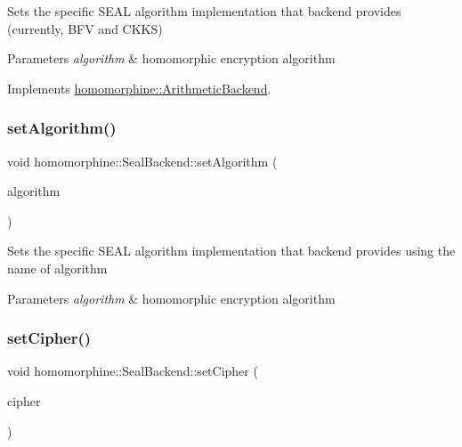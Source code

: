 Sets the specific S\+E\+AL algorithm implementation that backend provides (currently, B\+FV and C\+K\+KS)


\begin{DoxyParams}{Parameters}
{\em algorithm} & homomorphic encryption algorithm \\
\hline
\end{DoxyParams}


Implements \mbox{\hyperlink{classhomomorphine_1_1_arithmetic_backend_ac53135f4f66a2f7a33d3c6e6d465b86f}{homomorphine\+::\+Arithmetic\+Backend}}.

\mbox{\label{classhomomorphine_1_1_seal_backend_aaf2100eb13b4434bc0136ff00578bb8d}} 
\subsubsection{\texorpdfstring{setAlgorithm()}{setAlgorithm()}\hspace{0.1cm}{\footnotesize\ttfamily [2/2]}}
{\footnotesize\ttfamily void homomorphine\+::\+Seal\+Backend\+::set\+Algorithm (\begin{DoxyParamCaption}\item[{Seal\+Algorithm}]{algorithm }\end{DoxyParamCaption})}

Sets the specific S\+E\+AL algorithm implementation that backend provides using the name of algorithm


\begin{DoxyParams}{Parameters}
{\em algorithm} & homomorphic encryption algorithm \\
\hline
\end{DoxyParams}
\mbox{\label{classhomomorphine_1_1_seal_backend_a866b58e41809d68d4c6ed8c3afb27712}} 
\subsubsection{\texorpdfstring{setCipher()}{setCipher()}}
{\footnotesize\ttfamily void homomorphine\+::\+Seal\+Backend\+::set\+Cipher (\begin{DoxyParamCaption}\item[{string}]{cipher }\end{DoxyParamCaption})\hspace{0.3cm}{\ttfamily [virtual]}}

